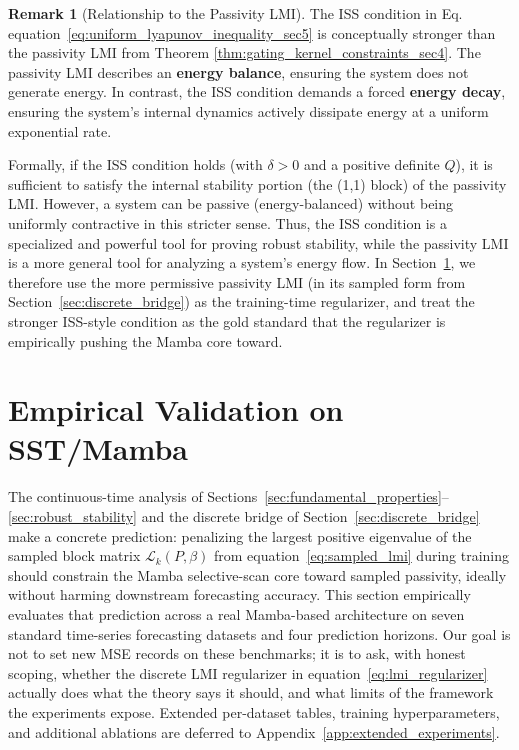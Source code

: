 \documentclass[10pt]{article} %
\def\eqref#1{equation~\ref{#1}}
\theoremstyle{definition}
\newtheorem{remark}[theorem]{Remark}
\begin{document}
\begin{remark}[Relationship to the Passivity LMI]
The ISS condition in Eq. \eqref{eq:uniform_lyapunov_inequality_sec5} is conceptually stronger than the passivity LMI from Theorem \ref{thm:gating_kernel_constraints_sec4}. The passivity LMI describes an \textbf{energy balance}, ensuring the system does not generate energy. In contrast, the ISS condition demands a forced \textbf{energy decay}, ensuring the system's internal dynamics actively dissipate energy at a uniform exponential rate.

Formally, if the ISS condition holds (with $\delta>0$ and a positive definite $Q$), it is sufficient to satisfy the internal stability portion (the (1,1) block) of the passivity LMI. However, a system can be passive (energy-balanced) without being uniformly contractive in this stricter sense. Thus, the ISS condition is a specialized and powerful tool for proving robust stability, while the passivity LMI is a more general tool for analyzing a system's energy flow. In Section~\ref{sec:experiments}, we therefore use the more permissive passivity LMI (in its sampled form from Section~\ref{sec:discrete_bridge}) as the training-time regularizer, and treat the stronger ISS-style condition as the gold standard that the regularizer is empirically pushing the Mamba core toward.
\end{remark}

\section{Empirical Validation on SST/Mamba}
\label{sec:experiments}

The continuous-time analysis of Sections~\ref{sec:fundamental_properties}--\ref{sec:robust_stability} and the discrete bridge of Section~\ref{sec:discrete_bridge} make a concrete prediction: penalizing the largest positive eigenvalue of the sampled block matrix $\mathcal{L}_k(P,\beta)$ from \eqref{eq:sampled_lmi} during training should constrain the Mamba selective-scan core toward sampled passivity, ideally without harming downstream forecasting accuracy. This section empirically evaluates that prediction across a real Mamba-based architecture on seven standard time-series forecasting datasets and four prediction horizons. Our goal is not to set new MSE records on these benchmarks; it is to ask, with honest scoping, whether the discrete LMI regularizer in \eqref{eq:lmi_regularizer} actually does what the theory says it should, and what limits of the framework the experiments expose. Extended per-dataset tables, training hyperparameters, and additional ablations are deferred to Appendix~\ref{app:extended_experiments}.
\end{document}
